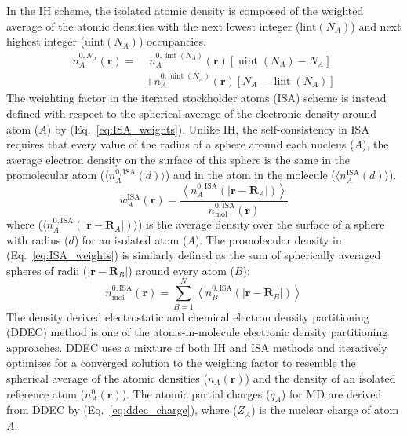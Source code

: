 %
In the IH scheme, the isolated atomic density is composed of the weighted average of the atomic densities with the next lowest integer ($\mathrm{lint}(N_A)$) and next highest integer ($\mathrm{uint}(N_A)$) occupancies. %
\begin{equation}
\begin{aligned}
n_{A}^{0, N_{A}}(\mathbf{r})=& \,\,n_{A}^{0, \operatorname{lint}\left(N_{A}\right)}(\mathbf{r})\left[\operatorname{uint}\left(N_{A}\right)-N_{A}\right] \\
&+n_{A}^{0, \operatorname{uint}\left(N_{A}\right)}(\mathbf{r})\left[N_{A}-\operatorname{lint}\left(N_{A}\right)\right]
\end{aligned}
\end{equation}
The weighting factor in the iterated stockholder atoms (ISA) scheme \cite{lillestolen2008redefining} is instead defined with respect to the spherical average of the electronic density around atom ($A$) by (Eq.~\ref{eq:ISA_weights}). Unlike IH, the self-consistency in ISA requires that every value of the radius of a sphere around each nucleus ($A$), the average electron density on the surface of this sphere is the same in the promolecular atom ($\langle n_{A}^{0, \mathrm{ISA}}(d)\rangle$) and in the atom in the molecule ($\langle n_{A}^{\mathrm{ISA}}(d)\rangle$).\cite{bultinck2009comparison}
%
\begin{equation} \label{eq:ISA_weights}
w_{A}^{\mathrm{ISA}}(\mathbf{r})=\frac{\left\langle n_{A}^{0,\mathrm{ISA}}\left(\left|\mathbf{r}-\mathbf{R}_{A}\right|\right)\right\rangle}{n_{\mathrm{mol}}^{0, \mathrm{ISA}}(\mathbf{r})}
\end{equation}
where ($\langle n_{A}^{0, \mathrm{ISA}}\left(\left|\mathbf{r}-\mathbf{R}_{A}\right|\right)\rangle$) is the average density over the surface of a sphere with radius ($d$) for an isolated atom ($A$). The promolecular density in (Eq.~\ref{eq:ISA_weights}) is similarly defined as the sum of spherically averaged spheres of radii ($|\mathbf{r} - \mathbf{R}_B|$) around every atom ($B$):
%
\begin{equation}
n_{\mathrm{mol}}^{0, \mathrm{ISA}}(\mathbf{r})=\sum_{B=1}^{N}\left\langle n_{B}^{0, \mathrm{ISA}}\left(\left|\mathbf{r}-\mathbf{R}_{B}\right|\right)\right\rangle
\end{equation}
The density derived electrostatic and chemical electron density partitioning (DDEC) method is one of the atoms-in-molecule electronic density partitioning approaches. DDEC uses a mixture of both IH and ISA methods and iteratively optimises for a converged solution to the weighing factor to resemble the spherical average of the atomic densities ($n_{A}(\mathbf{r})$) and the density of an isolated reference atom ($n_{A}^0(\mathbf{r})$). The atomic partial charges ($q_A$) for MD are derived from DDEC by (Eq.~\ref{eq:ddec_charge}), where ($Z_A$) is the nuclear charge of atom $A$. 
